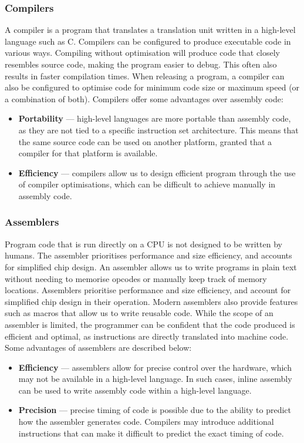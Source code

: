 \documentclass{article}
\begin{document}
\subsubsection{Compilers}
A compiler is a program that translates a translation unit written in a
high-level language such as C. Compilers can be configured to produce
executable code in various ways. Compiling without optimisation will
produce code that closely resembles source code, making the program
easier to debug. This often also results in faster compilation times.
When releasing a program, a compiler can also be configured to optimise
code for minimum code size or maximum speed (or a combination of both).
Compilers offer some advantages over assembly code:
\begin{itemize}
    \item \textbf{Portability} --- high-level languages are more
          portable than assembly code, as they are not tied to a specific
          instruction set architecture. This means that the same source code
          can be used on another platform, granted that a compiler for that
          platform is available.
    \item \textbf{Efficiency} --- compilers allow us to design efficient
          program through the use of compiler optimisations, which can be
          difficult to achieve manually in assembly code.
\end{itemize}
\subsubsection{Assemblers}
Program code that is run directly on a CPU is not designed to be
written by humans. The assembler prioritises performance and size
efficiency, and accounts for simplified chip design. An assembler
allows us to write programs in plain text without needing to memorise
opcodes or manually keep track of memory locations. Assemblers
prioritise performance and size efficiency, and account for simplified
chip design in their operation. Modern assemblers also provide features
such as macros that allow us to write reusable code. While the scope of
an assembler is limited, the programmer can be confident that the code
produced is efficient and optimal, as instructions are directly
translated into machine code. Some advantages of assemblers are
described below:
\begin{itemize}
    \item \textbf{Efficiency} --- assemblers allow for precise control
          over the hardware, which may not be available in a high-level
          language. In such cases, inline assembly can be used to write
          assembly code within a high-level language.
    \item \textbf{Precision} --- precise timing of code is possible due to
          the ability to predict how the assembler generates code. Compilers
          may introduce additional instructions that can make it difficult to
          predict the exact timing of code.
\end{itemize}
\end{document}
